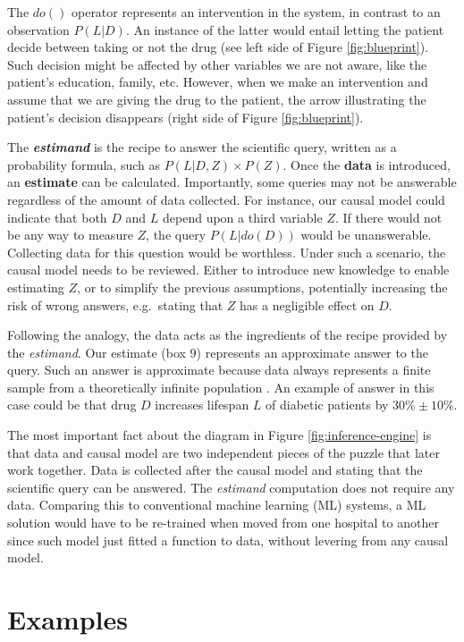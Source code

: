 \documentclass[
]{book}
\begin{document}
The \(do()\) operator represents an intervention in the system, in contrast to an observation \(P(L|D)\). An instance of the latter would entail letting the patient decide between taking or not the drug (see left side of Figure \ref{fig:blueprint}). Such decision might be affected by other variables we are not aware, like the patient's education, family, etc. However, when we make an intervention and assume that we are giving the drug to the patient, the arrow illustrating the patient's decision disappears (right side of Figure \ref{fig:blueprint}).

The \textbf{\emph{estimand}} is the recipe to answer the scientific query, written as a probability formula, such as \(P(L | D, Z) \times P(Z)\). Once the \textbf{data} is introduced, an \textbf{estimate} can be calculated. Importantly, some queries may not be answerable regardless of the amount of data collected. For instance, our causal model could indicate that both \(D\) and \(L\) depend upon a third variable \(Z\). If there would not be any way to measure \(Z\), the query \(P(L | do(D))\) would be unanswerable. Collecting data for this question would be worthless. Under such a scenario, the causal model needs to be reviewed. Either to introduce new knowledge to enable estimating \(Z\), or to simplify the previous assumptions, potentially increasing the risk of wrong answers, e.g.~stating that \(Z\) has a negligible effect on \(D\).

Following the analogy, the data acts as the ingredients of the recipe provided by the \emph{estimand}. Our estimate (box \(9\)) represents an approximate answer to the query. Such an answer is approximate because data always represents a finite sample from a theoretically infinite population \citep{book-of-why}. An example of answer in this case could be that drug \(D\) increases lifespan \(L\) of diabetic patients by \(30\% \pm 10\%\).

The most important fact about the diagram in Figure \ref{fig:inference-engine} is that data and causal model are two independent pieces of the puzzle that later work together. Data is collected after the causal model and stating that the scientific query can be answered. The \emph{estimand} computation does not require any data. Comparing this to conventional machine learning (ML) systems, a ML solution would have to be re-trained when moved from one hospital to another since such model just fitted a function to data, without levering from any causal model.

\hypertarget{examples-3}{%
\section{Examples}\label{examples-3}}
\end{document}
